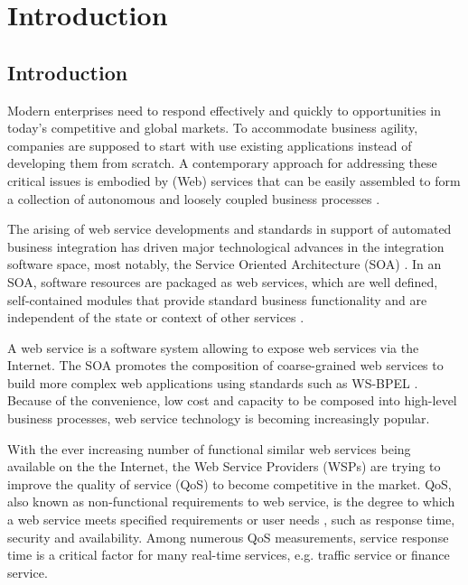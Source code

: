

\chapter{Introduction}\label{C:intro}
\section{Introduction}
Modern enterprises need to respond effectively and quickly to opportunities in today's competitive and global markets. 
To accommodate business agility, companies are supposed to start with use existing applications instead of
developing them from scratch. 
A contemporary approach for addressing these critical issues is embodied by (Web) services that can be 
easily assembled to form a collection of autonomous and loosely coupled business processes \cite{Papazoglou}.

The arising of web service developments and standards in support of automated business integration has 
driven major technological advances in the integration software space, most notably, 
the Service Oriented Architecture (SOA) \cite{Dan:2008}. In an SOA, software resources are packaged as 
web services, which are well defined, self-contained modules that provide standard business functionality
and are independent of the state or context of other services \cite{Ran}.

A web service is a software system allowing to expose web services via the Internet. The 
SOA promotes the composition of coarse-grained web services to build more complex
web applications using standards such as WS-BPEL \cite{std/ws-bpel2}. Because of the convenience, 
low cost and capacity \cite{Aboolian} to be composed into high-level business processes, web service technology is becoming increasingly popular.


With the ever increasing number of functional similar web services being available on the the Internet, the Web Service Providers (WSPs) are trying to improve the quality of service (QoS) to become competitive in the market.  
QoS, also known as non-functional requirements to  web service, is the degree to which a web service meets specified requirements or user needs \cite{4061431}, such as response time, security and availability. 
Among numerous QoS measurements, service response time is a critical factor for many real-time services, e.g. traffic service or finance service. 

